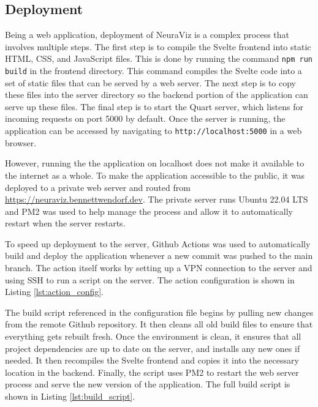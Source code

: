 \subsection{Deployment}
Being a web application, deployment of NeuraViz is a complex process that involves multiple steps. The first step is to compile the Svelte frontend into static HTML, CSS, and JavaScript files. This is done by running the command \texttt{npm run build} in the frontend directory. This command compiles the Svelte code into a set of static files that can be served by a web server. The next step is to copy these files into the server directory so the backend portion of the application can serve up these files. The final step is to start the Quart server, which listens for incoming requests on port 5000 by default. Once the server is running, the application can be accessed by navigating to \texttt{http://localhost:5000} in a web browser.

However, running the the application on localhost does not make it available to the internet as a whole. To make the application accessible to the public, it was deployed to a private web server and routed from \href{https://neuraviz.bennettwendorf.dev}{https://neuraviz.bennettwendorf.dev}. The private server runs Ubuntu 22.04 LTS and PM2 \cite{pm2} was used to help manage the process and allow it to automatically restart when the server restarts.

To speed up deployment to the server, Github Actions \cite{github_actions} was used to automatically build and deploy the application whenever a new commit was pushed to the main branch. The action itself works by setting up a VPN connection to the server and using SSH to run a script on the server. The action configuration is shown in Listing \ref{lst:action_config}.

\begin{center}
    
\end{center}

The build script referenced in the configuration file begins by pulling new changes from the remote Github repository. It then cleans all old build files to ensure that everything gets rebuilt fresh. Once the environment is clean, it ensures that all project dependencies are up to date on the server, and installs any new ones if needed. It then recompiles the Svelte frontend and copies it into the necessary location in the backend. Finally, the script uses PM2 to restart the web server process and serve the new version of the application. The full build script is shown in Listing \ref{lst:build_script}.